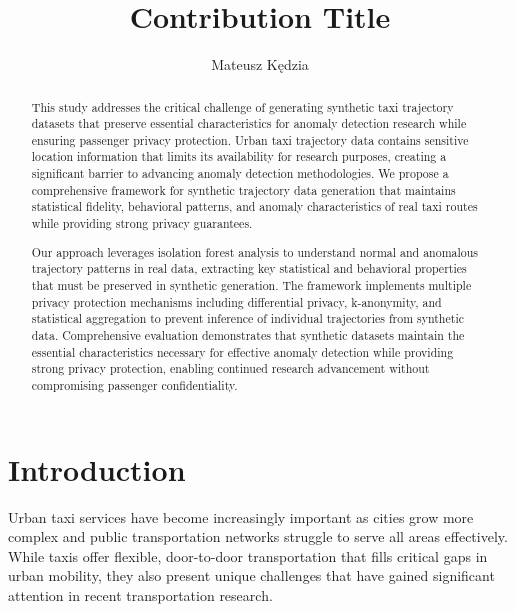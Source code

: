 \documentclass[runningheads]{llncs}
\begin{document}

\title{Contribution Title}
\author{Mateusz K{\k e}dzia}
\maketitle

\begin{abstract}
This study addresses the critical challenge of generating synthetic taxi trajectory datasets that preserve essential characteristics for anomaly detection research while ensuring passenger privacy protection. Urban taxi trajectory data contains sensitive location information that limits its availability for research purposes, creating a significant barrier to advancing anomaly detection methodologies. We propose a comprehensive framework for synthetic trajectory data generation that maintains statistical fidelity, behavioral patterns, and anomaly characteristics of real taxi routes while providing strong privacy guarantees.

Our approach leverages isolation forest analysis to understand normal and anomalous trajectory patterns in real data, extracting key statistical and behavioral properties that must be preserved in synthetic generation. The framework implements multiple privacy protection mechanisms including differential privacy, k-anonymity, and statistical aggregation to prevent inference of individual trajectories from synthetic data. Comprehensive evaluation demonstrates that synthetic datasets maintain the essential characteristics necessary for effective anomaly detection while providing strong privacy protection, enabling continued research advancement without compromising passenger confidentiality.

\end{abstract}

\newpage


\section{Introduction}
\label{sec:introduction}

Urban taxi services have become increasingly important as cities grow more complex and public transportation networks struggle to serve all areas effectively. While taxis offer flexible, door-to-door transportation that fills critical gaps in urban mobility, they also present unique challenges that have gained significant attention in recent transportation research.
\end{document}
